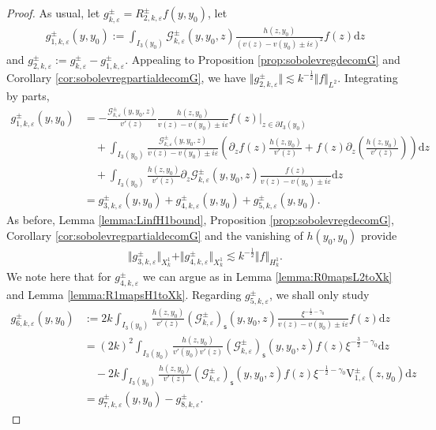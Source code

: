 \documentclass[11pt,reqno]{amsproc}
\theoremstyle{definition}
\numberwithin{equation}{section}
\newcommand{\G}{{\mathcal{G}}}
\newcommand{\s}{{\mathsf{s}}}
\renewcommand{\d}{\mathrm{d}}
\newcommand{\ep}{\varepsilon}
\begin{document}
\begin{proof}
As usual, let $g_{k,\ep}^\pm=R_{2,k,\ep}^\pm f(y,y_0)$, let 
\begin{align*}
g_{1,k,\ep}^\pm(y,y_0) := \int_{I_3(y_0)} \G_{k,\ep}^\pm(y,y_0,z) \frac{h(z,y_0)}{(v(z) - v(y_0) \pm i\ep)^2}f(z) \d z
\end{align*}
and $g_{2,k,\ep}^\pm := g_{k,\ep}^\pm - g_{1,k,\ep}^\pm$. Appealing to Proposition \ref{prop:sobolevregdecomG} and Corollary \ref{cor:sobolevregpartialdecomG}, we have $\Vert g_{2,k,\ep}^\pm \Vert \lesssim k^{-\frac12}\Vert f \Vert_{L^2}$. Integrating by parts,
\begin{align*}
g_{1,k,\ep}^\pm(y,y_0) &= - \frac{\G_{k,\ep}^\pm(y,y_0,z)}{v'(z)}\frac{h(z,y_0)}{v(z) - v(y_0) \pm i\ep}f(z) \Big|_{z\in \partial I_3(y_0)} \\
&\quad + \int_{I_3(y_0)} \frac{\G_{k,\ep}^\pm(y,y_0,z)}{v(z) - v(y_0) \pm i\ep}\left( \partial_z f(z)\frac{h(z,y_0)}{v'(z)}  + f(z)\partial_z  \left(\frac{h(z,y_0)}{v'(z)} \right) \right)  \d z \\
&\quad +\int_{I_3(y_0)}\frac{h(z,y_0)}{v'(z)}\partial_z  \G_{k,\ep}^\pm(y,y_0,z) \frac{f(z)}{v(z) - v(y_0) \pm i\ep} \d z \\
&=g_{3,k,\ep}^\pm(y,y_0) + g_{4,k,\ep}^\pm(y,y_0) + g_{5,k,\ep}^\pm(y,y_0).
\end{align*}  
As before, Lemma \ref{lemma:LinfH1bound}, Proposition \ref{prop:sobolevregdecomG}, Corollary \ref{cor:sobolevregpartialdecomG} and the vanishing of $h(y_0,y_0)$ provide 
\begin{align*}
\Vert g_{3,k,\ep}^\pm \Vert_{X_k^1} + \Vert g_{4,k,\ep}^\pm \Vert_{X_k^1} \lesssim k^{-\frac12}\Vert f \Vert_{H_k^1}.
\end{align*}
We note here that for $g_{4,k,\ep}^\pm$ we can argue as in Lemma \ref{lemma:R0mapsL2toXk} and Lemma \ref{lemma:R1mapsH1toXk}. Regarding $g_{5,k,\ep}^\pm$, we shall only study
\begin{align*}
g_{6,k,\ep}^\pm(y,y_0) &:=2k\int_{I_3(y_0)} \frac{h(z,y_0)}{v'(z)}\left( \G_{k,\ep}^\pm \right)_\s(y,y_0,z) \frac{\xi^{-\frac12-\gamma_0}}{v(z) - v(y_0) \pm i\ep} f(z) \d z \\
&= (2k)^2\int_{I_3(y_0)} \frac{h(z,y_0)}{v'(y_0)v'(z)}\left( \G_{k,\ep}^\pm \right)_\s(y,y_0,z) f(z)\xi^{-\frac32-\gamma_0} \d z \\
&\quad -2k \int_{I_3(y_0)} \frac{h(z,y_0)}{v'(z)}\left( \G_{k,\ep}^\pm \right)_\s(y,y_0,z) f(z)\xi^{-\frac12-\gamma_0}\mathrm{V}_{1,\ep}^\pm(z,y_0) \d z \\
&= g_{7,k,\ep}^\pm(y,y_0) - g_{8,k,\ep}^\pm.

\end{align*}
\end{proof}
\end{document}
